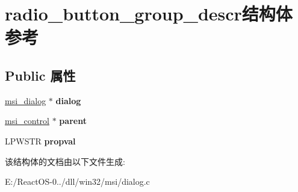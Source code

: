 \hypertarget{structradio__button__group__descr}{}\section{radio\+\_\+button\+\_\+group\+\_\+descr结构体 参考}
\label{structradio__button__group__descr}
\subsection*{Public 属性}
\begin{DoxyCompactItemize}
\item 
\mbox{\label{structradio__button__group__descr_a2bd65caa9f9168a7d2c4759609d23233}} 
\hyperlink{structmsi__dialog__tag}{msi\+\_\+dialog} $\ast$ {\bfseries dialog}
\item 
\mbox{\label{structradio__button__group__descr_a090f008ab73999298d9926fc5c08a285}} 
\hyperlink{structmsi__control__tag}{msi\+\_\+control} $\ast$ {\bfseries parent}
\item 
\mbox{\label{structradio__button__group__descr_aae7c1c9902ac5e1184b25b3648ad39a4}} 
L\+P\+W\+S\+TR {\bfseries propval}
\end{DoxyCompactItemize}


该结构体的文档由以下文件生成\+:\begin{DoxyCompactItemize}
\item 
E\+:/\+React\+O\+S-\/0../dll/win32/msi/dialog.\+c\end{DoxyCompactItemize}
